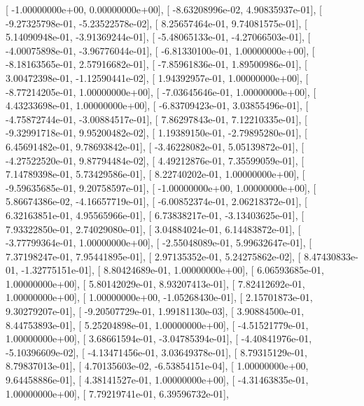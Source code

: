 \documentclass{article}
\begin{document}
       [ -1.00000000e+00,   0.00000000e+00],
       [ -8.63208996e-02,   4.90835937e-01],
       [ -9.27325798e-01,  -5.23522578e-02],
       [  8.25657464e-01,   9.74081575e-01],
       [  5.14090948e-01,  -3.91369244e-01],
       [ -5.48065133e-01,  -4.27066503e-01],
       [ -4.00075898e-01,  -3.96776044e-01],
       [ -6.81330100e-01,   1.00000000e+00],
       [ -8.18163565e-01,   2.57916682e-01],
       [ -7.85961836e-01,   1.89500986e-01],
       [  3.00472398e-01,  -1.12590441e-02],
       [  1.94392957e-01,   1.00000000e+00],
       [ -8.77214205e-01,   1.00000000e+00],
       [ -7.03645646e-01,   1.00000000e+00],
       [  4.43233698e-01,   1.00000000e+00],
       [ -6.83709423e-01,   3.03855496e-01],
       [ -4.75872744e-01,  -3.00884517e-01],
       [  7.86297843e-01,   7.12210335e-01],
       [ -9.32991718e-01,   9.95200482e-02],
       [  1.19389150e-01,  -2.79895280e-01],
       [  6.45691482e-01,   9.78693842e-01],
       [ -3.46228082e-01,   5.05139872e-01],
       [ -4.27522520e-01,   9.87794484e-02],
       [  4.49212876e-01,   7.35599059e-01],
       [  7.14789398e-01,   5.73429586e-01],
       [  8.22740202e-01,   1.00000000e+00],
       [ -9.59635685e-01,   9.20758597e-01],
       [ -1.00000000e+00,   1.00000000e+00],
       [  5.86674386e-02,  -4.16657719e-01],
       [ -6.00852374e-01,   2.06218372e-01],
       [  6.32163851e-01,   4.95565966e-01],
       [  6.73838217e-01,  -3.13403625e-01],
       [  7.93322850e-01,   2.74029080e-01],
       [  3.04884024e-01,   6.14483872e-01],
       [ -3.77799364e-01,   1.00000000e+00],
       [ -2.55048089e-01,   5.99632647e-01],
       [  7.37198247e-01,   7.95441895e-01],
       [  2.97135352e-01,   5.24275862e-02],
       [  8.47430833e-01,  -1.32775151e-01],
       [  8.80424689e-01,   1.00000000e+00],
       [  6.06593685e-01,   1.00000000e+00],
       [  5.80142029e-01,   8.93207413e-01],
       [  7.82412692e-01,   1.00000000e+00],
       [  1.00000000e+00,  -1.05268430e-01],
       [  2.15701873e-01,   9.30279207e-01],
       [ -9.20507729e-01,   1.99181130e-03],
       [  3.90884500e-01,   8.44753893e-01],
       [  5.25204898e-01,   1.00000000e+00],
       [ -4.51521779e-01,   1.00000000e+00],
       [  3.68661594e-01,  -3.04785394e-01],
       [ -4.40841976e-01,  -5.10396609e-02],
       [ -4.13471456e-01,   3.03649378e-01],
       [  8.79315129e-01,   8.79837013e-01],
       [  4.70135603e-02,  -6.53854151e-04],
       [  1.00000000e+00,   9.64458886e-01],
       [  4.38141527e-01,   1.00000000e+00],
       [ -4.31463835e-01,   1.00000000e+00],
       [  7.79219741e-01,   6.39596732e-01],
\end{document}
